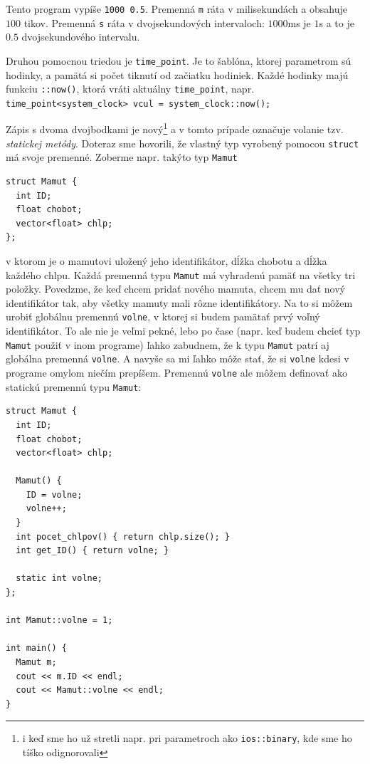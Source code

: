 \documentclass[10pt]{article}
\def\prg{\lstinline}
\def\ods{\vspace*{10pt}}
\begin{document}
{Tento program vypíše {\tt 1000 0.5}. Premenná {\tt m}  ráta v milisekundách a
obsahuje $100$ tikov. Premenná {\tt s} ráta v dvojsekundových intervaloch:
$1000$ms je $1$s a to je $0.5$ dvojsekundového intervalu.

\ods
Druhou pomocnou triedou je \prg!time_point!. Je to šablóna, ktorej parametrom sú hodinky,
a pamätá si počet tiknutí od začiatku hodiniek. Každé hodinky majú funkciu \prg!::now()!,
ktorá vráti aktuálny \prg!time_point!, napr.
\prg!time_point<system_clock> vcul = system_clock::now();!

\ods Zápis s dvoma dvojbodkami je nový\footnote{i keď sme ho už stretli napr.
pri parametroch ako \prg!ios::binary!, kde sme ho tíško odignorovali} a v tomto
prípade označuje volanie tzv. {\em statickej metódy}. Doteraz sme hovorili,
že vlastný typ vyrobený pomocou \prg!struct! má svoje premenné. 
Zoberme napr. takýto 
typ {\tt Mamut}

\begin{lstlisting}
struct Mamut {
  int ID;
  float chobot;
  vector<float> chlp;
};
\end{lstlisting}

v ktorom je o mamutovi uložený jeho identifikátor,  dĺžka chobotu 
a dĺžka každého chlpu. Každá premenná typu {\tt Mamut} má vyhradenú
pamäť na všetky tri položky. Povedzme, že keď chcem pridať nového mamuta,
chcem mu dať nový identifikátor tak, aby všetky mamuty mali rôzne
identifikátory. 
Na to si môžem urobiť globálnu premennú {\tt volne}, v ktorej si budem
pamätať prvý voľný identifikátor. To ale nie je veľmi pekné, lebo po čase (napr.
keď budem chcieť typ {\tt Mamut} použiť v inom programe) ľahko zabudnem, že 
k typu {\tt Mamut} patrí aj globálna premenná {\tt volne}. A navyše sa mi
ľahko môže stať, že si {\tt volne} kdesi v programe omylom niečím prepíšem.
Premennú {\tt volne} ale môžem definovať ako statickú premennú typu {\tt Mamut}:

\begin{lstlisting}
struct Mamut {
  int ID;
  float chobot;
  vector<float> chlp;

  Mamut() {
    ID = volne;
    volne++;
  }
  int pocet_chlpov() { return chlp.size(); }
  int get_ID() { return volne; }

  static int volne;
};

int Mamut::volne = 1;

int main() {
  Mamut m;
  cout << m.ID << endl;
  cout << Mamut::volne << endl;
}
\end{lstlisting}

}
\end{document}
